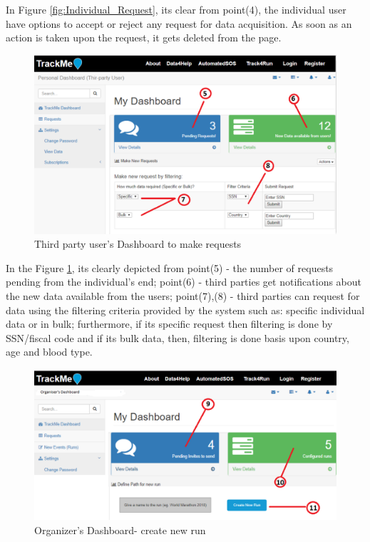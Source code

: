 \documentclass[a4paper, hidelinks, 12pt]{report}
\begin{document}
	In Figure \ref{fig:Individual_Request}, its clear from point(4), the individual user have options to accept or reject any request for data acquisition. As soon as an action is taken upon the request, it gets deleted from the page.\\
	
	\begin{figure}[H]
		\centering
		\includegraphics[width=1\textwidth]{../Assets/Make_Request.png}\caption[UI: Third party user's Dashboard to make requests]{Third party user's Dashboard to make requests}
		\label{fig:Make_Request}
	\end{figure}
	
	In the Figure \ref{fig:Make_Request}, its clearly depicted from point(5) - the number of requests pending from the individual's end; point(6) - third parties get notifications about the new data available from the users; point(7),(8) - third parties can  request for  data using the filtering criteria provided by the system such as: specific individual data or in bulk; furthermore, if its specific request then filtering is done by SSN/fiscal code and if its bulk data, then, filtering is done basis upon country, age and blood type.
	
	\begin{figure}[H]
		\centering
		\includegraphics[width=1\textwidth]{../Assets/organizer_dashboard_1.png}\caption[UI: Organizer's Dashboard - create new run]{Organizer's Dashboard- create new run}
		\label{fig:organizer_dashboard_1}
	\end{figure}
	
\end{document}
